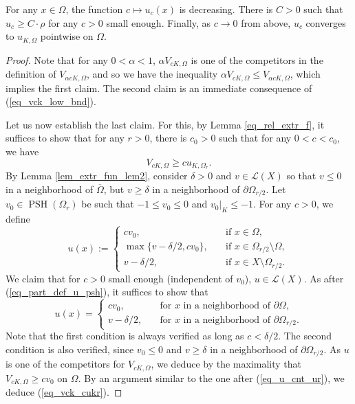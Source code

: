 \documentclass[10pt,a4paper]{amsart}
\newcommand{\psh}{\operatorname{PSH}}
\begin{document}
	\begin{prop}
		For any $x \in \Omega$, the function $c \mapsto u_c(x)$ is decreasing.
		There is $C > 0$ such that $u_c \geq C \cdot \rho$ for any $c > 0$ small enough.
		Finally, as $c \to 0$ from above, $u_c$ converges to $u_{K, \Omega}$ pointwise on $\Omega$.
	\end{prop}

	\begin{proof}
		Note that for any $0 < \alpha < 1$, $\alpha V_{cK, \Omega}$ is one of the competitors in the definition of $V_{\alpha cK, \Omega}$, and so we have the inequality $\alpha V_{cK, \Omega} \leq V_{\alpha cK, \Omega}$, which implies the first claim.
		The second claim is an immediate consequence of (\ref{eq_vck_low_bnd}).
		\par 
		Let us now establish the last claim.
		For this, by Lemma \ref{eq_rel_extr_f}, it suffices to show that for any $r > 0$, there is $c_0 > 0$ such that for any $0 < c < c_0$, we have 
		\begin{equation}\label{eq_vck_cukr}
			V_{cK, \Omega} \geq c u_{K, \Omega_r}.
		\end{equation}
		By Lemma \ref{lem_extr_fun_lem2}, consider $\delta > 0$ and $v \in \mathscr{L}(X)$ so that $v \leq 0$ in a neighborhood of $\overline{\Omega}$, but $v \geq \delta$ in a neighborhood of $\partial \Omega_{r/2}$.
		Let $v_0 \in \psh(\Omega_r)$ be such that $-1 \leq v_0 \leq 0$ and $v_0|_K \leq -1$.
		For any $c > 0$, we define
		\begin{equation}
			u(x) 
			:=
			\begin{cases}
				c v_0, \quad &\text{if } x \in \Omega,
				\\
				\max \big\{ v - \delta/2,  c v_0 \big\}, \quad &\text{if } x \in \Omega_{r/2} \setminus \Omega,
				\\
				v - \delta/2, \quad &\text{if } x \in X \setminus \Omega_{r/2}.
			\end{cases} 
		\end{equation}
		We claim that for $c > 0$ small enough (independent of $v_0$), $u \in \mathscr{L}(X)$. 
		As after (\ref{eq_part_def_u_psh}), it suffices to show that 
		\begin{equation}
			u(x) 
			=
			\begin{cases}
				c v_0, \quad &\text{for $x$ in a neighborhood of $\partial \Omega$},
				\\
				v - \delta/2, \quad &\text{for $x$ in a neighborhood of $\partial \Omega_{r/2}$.}
			\end{cases} 
		\end{equation}
		Note that the first condition is always verified as long as $c < \delta/2$.
		The second condition is also verified, since $v_0 \leq 0$ and $v \geq \delta$ in a neighborhood of $\partial \Omega_{r/2}$.
		As $u$ is one of the competitors for $V_{cK, \Omega}$, we deduce by the maximality that $V_{cK, \Omega} \geq c v_0$ on $\Omega$.
		By an argument similar to the one after (\ref{eq_u_cnt_ur}), we deduce (\ref{eq_vck_cukr}).
	\end{proof}
\end{document}
